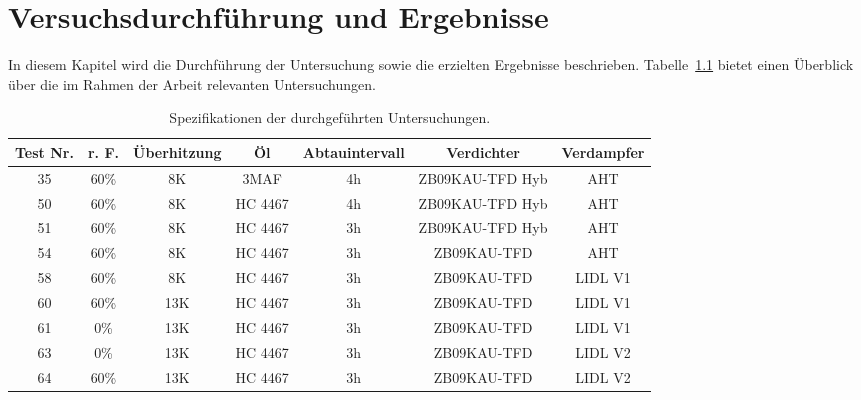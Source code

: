 
\chapter{Versuchsdurchführung und Ergebnisse}
\label{cha:Versuchsdurchführung}

In diesem Kapitel wird die Durchführung der Untersuchung sowie die erzielten Ergebnisse beschrieben. Tabelle~\ref{tab:alltests} bietet einen Überblick über die im Rahmen der Arbeit relevanten Untersuchungen.

\begin{table}[h!]
\centering
\caption{Spezifikationen der durchgeführten Untersuchungen.}
\label{tab:alltests}
\begin{tabular}{|ccccccc|}
\hline
Test Nr.              & r. F.                     & Überhitzung              & Öl                               & Abtauintervall          & Verdichter                           & Verdampfer \\ \hline
\multicolumn{1}{|c|}{35} & \multicolumn{1}{c|}{60\%} & \multicolumn{1}{c|}{8K}  & \multicolumn{1}{c|}{3MAF}        & \multicolumn{1}{c|}{4h} & \multicolumn{1}{c|}{ZB09KAU-TFD Hyb} & AHT        \\
\multicolumn{1}{|c|}{50} & \multicolumn{1}{c|}{60\%} & \multicolumn{1}{c|}{8K}  & \multicolumn{1}{c|}{HC 4467} & \multicolumn{1}{c|}{4h} & \multicolumn{1}{c|}{ZB09KAU-TFD Hyb} & AHT        \\
\multicolumn{1}{|c|}{51} & \multicolumn{1}{c|}{60\%} & \multicolumn{1}{c|}{8K}  & \multicolumn{1}{c|}{HC 4467} & \multicolumn{1}{c|}{3h} & \multicolumn{1}{c|}{ZB09KAU-TFD Hyb} & AHT        \\
\multicolumn{1}{|c|}{54} & \multicolumn{1}{c|}{60\%} & \multicolumn{1}{c|}{8K}  & \multicolumn{1}{c|}{HC 4467} & \multicolumn{1}{c|}{3h} & \multicolumn{1}{c|}{ZB09KAU-TFD}     & AHT        \\
\multicolumn{1}{|c|}{58} & \multicolumn{1}{c|}{60\%} & \multicolumn{1}{c|}{8K}  & \multicolumn{1}{c|}{HC 4467} & \multicolumn{1}{c|}{3h} & \multicolumn{1}{c|}{ZB09KAU-TFD}     & LIDL V1    \\
\multicolumn{1}{|c|}{60} & \multicolumn{1}{c|}{60\%} & \multicolumn{1}{c|}{13K} & \multicolumn{1}{c|}{HC 4467} & \multicolumn{1}{c|}{3h} & \multicolumn{1}{c|}{ZB09KAU-TFD}     & LIDL V1    \\
\multicolumn{1}{|c|}{61} & \multicolumn{1}{c|}{0\%}  & \multicolumn{1}{c|}{13K} & \multicolumn{1}{c|}{HC 4467} & \multicolumn{1}{c|}{3h} & \multicolumn{1}{c|}{ZB09KAU-TFD}     & LIDL V1    \\
\multicolumn{1}{|c|}{63} & \multicolumn{1}{c|}{0\%}  & \multicolumn{1}{c|}{13K} & \multicolumn{1}{c|}{HC 4467} & \multicolumn{1}{c|}{3h} & \multicolumn{1}{c|}{ZB09KAU-TFD}     & LIDL V2    \\
\multicolumn{1}{|c|}{64} & \multicolumn{1}{c|}{60\%} & \multicolumn{1}{c|}{13K} & \multicolumn{1}{c|}{HC 4467} & \multicolumn{1}{c|}{3h} & \multicolumn{1}{c|}{ZB09KAU-TFD}     & LIDL V2    \\ \hline
\end{tabular}
\end{table}

